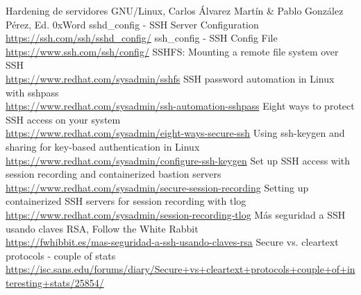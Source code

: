 \documentclass[a4paper, 11pt, titlepage]{article}
\begin{document}
\newpage
\begin{thebibliography}{X}
    \bibitem{} Hardening de servidores GNU/Linux, Carlos Álvarez Martín \& Pablo González Pérez, Ed. 0xWord
    \bibitem{} sshd\_config - SSH Server Configuration \\ \url{https://ssh.com/ssh/sshd_config/}
    \bibitem{} ssh\_config - SSH Config File \\ \url{https://www.ssh.com/ssh/config/}
    \bibitem{} SSHFS: Mounting a remote file system over SSH \\ \url{https://www.redhat.com/sysadmin/sshfs}
    \bibitem{} SSH password automation in Linux with sshpass \\ \url{https://www.redhat.com/sysadmin/ssh-automation-sshpass}
    \bibitem{} Eight ways to protect SSH access on your system \\ \url{https://www.redhat.com/sysadmin/eight-ways-secure-ssh}
    \bibitem{} Using ssh-keygen and sharing for key-based authentication in Linux \\ \url{https://www.redhat.com/sysadmin/configure-ssh-keygen}
    \bibitem{} Set up SSH access with session recording and containerized bastion servers \\ \url{https://www.redhat.com/sysadmin/secure-session-recording}
    \bibitem{} Setting up containerized SSH servers for session recording with tlog \\ \url{https://www.redhat.com/sysadmin/session-recording-tlog}
    \bibitem{} Más seguridad a SSH usando claves RSA, Follow the White Rabbit \\ \url{https://fwhibbit.es/mas-seguridad-a-ssh-usando-claves-rsa}
     Secure vs. cleartext protocols - couple of stats \\ \url{https://isc.sans.edu/forums/diary/Secure+vs+cleartext+protocols+couple+of+interesting+stats/25854/}
\end{thebibliography}
\end{document}
